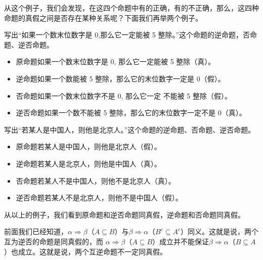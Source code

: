 \bigskip
从这个例子，我们会发现，在这四个命题中有的正确，有的不正确，那么，这四种命题的真假之间是否存在某种关系呢？下面我们再举两个例子。

\begin{example}
	写出“如果一个数末位数字是 0,那么它一定能被 5 整除。”这个命题的逆命题，否命题、逆否命题。
	\begin{itemize}
		\item 原命题\quad 如果一个数末位数字是 0, 那么它一定能被 5 整除（真）。
		\item 逆命题\quad 如果一个数能被 5 整除，那么它的末位数字一定是 0（假）。
		\item 否命题\quad 如果一个数末位数字不是 0, 那么它一定 不能被 5 整除（假）。
		\item 逆否命题\quad 如果一个数不能被 5 整除，那么它的末位数字一定不是 0（真）。
	\end{itemize}
\end{example}

\begin{example}
	写出“若某人是中国人，则他是北京人。”这个命题的逆命题、否命题、逆否命题。
	\begin{itemize}
		\item 原命题\quad 若某人是中国人，则他是北京人（假）。
		\item 逆命题\quad 若某人是北京人，则他是中国人（真）。
		\item 否命题\quad 若某人不是中国人，则他不是北京人（真）。
		\item 逆否命题\quad 若某人不是北京人，则他不是中国人（假）。
	\end{itemize}
\end{example}

从以上的例子，我们看到原命题和逆否命题同真假，逆命题和否命题同真假。

前面我们已经知道，$\alpha\Rightarrow \beta$（$A\subseteq B$）与$\beta\Rightarrow\alpha$（$B^c\subseteq A^c$）同义。这就是说，两个互为逆否的命题是同真假的，而 $\alpha\Rightarrow\beta$（$A\subseteq B$）成立并不能保证$\beta\Rightarrow \alpha$（$B\subseteq A$）也成立。这就是说，两个互逆命题不一定同真假。

